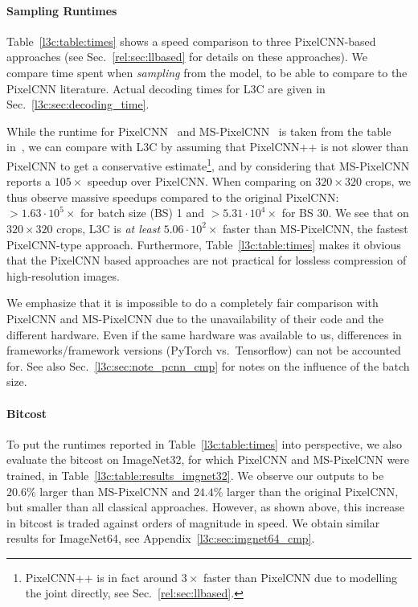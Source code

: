 \paragraph{Sampling Runtimes} Table~\ref{l3c:table:times} shows a speed comparison to three PixelCNN-based approaches (see Sec.~\ref{rel:sec:llbased} for details on these approaches).
%
We compare time spent when \emph{sampling} from the model, to be able to compare to the PixelCNN literature. Actual decoding times for L3C are given in Sec.~\ref{l3c:sec:decoding_time}.


While the runtime for PixelCNN~\cite{van2016pixel} and MS-PixelCNN~\cite{reed2017parallel} is taken from the table in~\cite{reed2017parallel}, we can compare with L3C by assuming that PixelCNN++ is not slower than PixelCNN to get a conservative estimate\footnote{PixelCNN++ is in fact around $3\times$ faster than PixelCNN due to modelling the joint directly, see Sec.~\ref{rel:sec:llbased}.},
and by considering that MS-PixelCNN reports a $105{\times}$ speedup over PixelCNN.
When comparing on $320 \times 320$ crops, we thus observe massive speedups compared to the original PixelCNN: ${>}1.63\cdot10^5\times$ for batch size (BS) 1 and ${>}5.31\cdot10^4\times$ for BS 30. 
We see that on $320 \times 320$ crops, L3C is \emph{at least} $5.06\cdot10^2\times$ faster than MS-PixelCNN, the fastest PixelCNN-type approach.
Furthermore, Table~\ref{l3c:table:times} makes it obvious that the PixelCNN based approaches are not practical for lossless compression of high-resolution images. 

We emphasize that it is impossible to do a completely fair comparison with PixelCNN and MS-PixelCNN due to the unavailability of their code and the different hardware. Even if the same hardware was available to us, differences in frameworks/framework versions (PyTorch vs.\ Tensorflow) can not be accounted for. See also Sec.~\ref{l3c:sec:note_pcnn_cmp} for notes on the influence of the batch size.
%

\paragraph{Bitcost} To put the runtimes reported in Table~\ref{l3c:table:times} into perspective, we also evaluate the bitcost on ImageNet32, for which PixelCNN and MS-PixelCNN were trained, in Table~\ref{l3c:table:results_imgnet32}.
%
We observe our outputs to be $20.6\%$ larger than MS-PixelCNN and $24.4\%$ larger than the original PixelCNN, but smaller than all classical approaches. However, as shown above, this increase in bitcost is traded against orders of magnitude in speed. We obtain similar results for ImageNet64, see Appendix~\ref{l3c:sec:imgnet64_cmp}.
%

